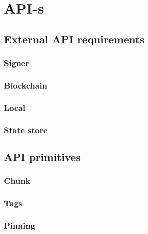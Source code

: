 \chapter{API-s}\label{spec:api}

\section{External API requirements\statusorange}\label{spec:api:external}
\subsection{Signer}\label{spec:api:signer}
% 

\subsection{Blockchain \statusred}\label{spec:api:blockchain}
% 

\subsection{Local \statusred}\label{spec:api:local}
% 

\subsection{State store \statusred}\label{spec:api:statestore}
% 



\section{API primitives}\label{spec:api:primitives}

\subsection{Chunk \statusred}\label{spec:api:chunkx}
% 

\subsection{Tags \statusred}\label{spec:api:tags}


\subsection{Pinning
\statusorange}\label{spec:api:pinning}


